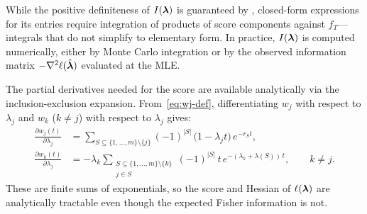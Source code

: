 \begin{remark}\label{rmk:fisher-explicit}
While the positive definiteness of $I(\boldsymbol{\lambda})$ is guaranteed by
, closed-form expressions for its entries require
integration of products of score components against $f_T$---integrals
that do not simplify to elementary form.  In practice, $I(\boldsymbol{\lambda})$ is
computed numerically, either by Monte Carlo integration or by the
observed information matrix $-\nabla^2 \ell(\hat{\boldsymbol{\lambda}})$ evaluated
at the MLE.

The partial derivatives needed for the score are available analytically
via the inclusion-exclusion expansion.  From~\eqref{eq:wj-def},
differentiating $w_j$ with respect to $\lambda_j$ and $w_k$ ($k \neq j$)
with respect to $\lambda_j$ gives:
\begin{align}
  \frac{\partial w_j(t)}{\partial \lambda_j}
  &= \sum_{S \subseteq \{1,\ldots,m\} \setminus \{j\}}
    (-1)^{|S|}\, \bigl(1 - \lambda_j t\bigr)\, e^{-r_S t},
  \label{eq:dwj-dlamj} \\[6pt]
  \frac{\partial w_k(t)}{\partial \lambda_j}
  &= -\lambda_k \sum_{\substack{S \subseteq \{1,\ldots,m\} \setminus \{k\} \\
    j \in S}} (-1)^{|S|}\, t\, e^{-({\lambda_k + \lambda(S)})\, t},
  \qquad k \neq j.
  \label{eq:dwk-dlamj}
\end{align}
These are finite sums of exponentials, so the score and Hessian of
$\ell(\boldsymbol{\lambda})$ are analytically tractable even though the expected Fisher
information is not.
\end{remark}
